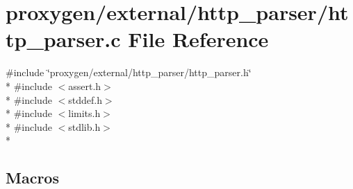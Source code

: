 \section{proxygen/external/http\+\_\+parser/http\+\_\+parser.c File Reference}
\label{http__parser_8c}
{\ttfamily \#include \char`\"{}proxygen/external/http\+\_\+parser/http\+\_\+parser.\+h\char`\"{}}\\*
{\ttfamily \#include $<$assert.\+h$>$}\\*
{\ttfamily \#include $<$stddef.\+h$>$}\\*
{\ttfamily \#include $<$limits.\+h$>$}\\*
{\ttfamily \#include $<$stdlib.\+h$>$}\\*
\subsection*{Macros}
